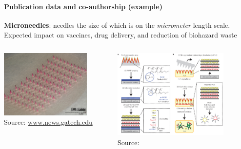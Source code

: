 \documentclass[8pt]{beamer}
\begin{document}

\begin{frame}
\frametitle{\insertsection}
\framesubtitle{Publication data and co-authorship (example)}

\textbf{Microneedles}: needles the size of which is on the \textit{micrometer} length scale. Expected impact on vaccines, drug delivery, and reduction of biohazard waste
   
\begin{columns}

\begin{minipage}[c][.6\textheight][c]{\linewidth}
\centering
\includegraphics[width=0.8\textwidth,keepaspectratio]{micro1}\\
\tiny{Source: \url{www.news.gatech.edu}}	 	
\end{minipage}
        
\begin{minipage}[c][.6\textheight][c]{\linewidth}
\centering
\includegraphics[width=0.8\textwidth,keepaspectratio]{micro2}\\
\tiny{Source: \cite{DeMuth2013}}	
\end{minipage}

\end{columns}

\end{frame}
\end{document}
